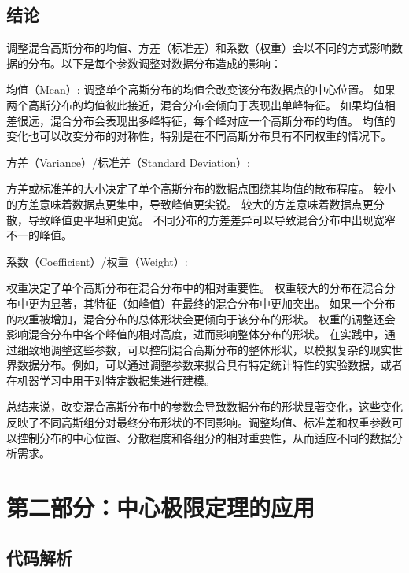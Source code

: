 \documentclass[a4paper]{article}
\begin{document}
\subsection{结论}
调整混合高斯分布的均值、方差（标准差）和系数（权重）会以不同的方式影响数据的分布。以下是每个参数调整对数据分布造成的影响：
\begin{list}
    \item 均值（Mean）:
调整单个高斯分布的均值会改变该分布数据点的中心位置。
如果两个高斯分布的均值彼此接近，混合分布会倾向于表现出单峰特征。
如果均值相差很远，混合分布会表现出多峰特征，每个峰对应一个高斯分布的均值。
均值的变化也可以改变分布的对称性，特别是在不同高斯分布具有不同权重的情况下。

    \item 方差（Variance）/标准差（Standard Deviation）:

方差或标准差的大小决定了单个高斯分布的数据点围绕其均值的散布程度。
较小的方差意味着数据点更集中，导致峰值更尖锐。
较大的方差意味着数据点更分散，导致峰值更平坦和更宽。
不同分布的方差差异可以导致混合分布中出现宽窄不一的峰值。

    \item 系数（Coefficient）/权重（Weight）:

权重决定了单个高斯分布在混合分布中的相对重要性。
权重较大的分布在混合分布中更为显著，其特征（如峰值）在最终的混合分布中更加突出。
如果一个分布的权重被增加，混合分布的总体形状会更倾向于该分布的形状。
权重的调整还会影响混合分布中各个峰值的相对高度，进而影响整体分布的形状。
在实践中，通过细致地调整这些参数，可以控制混合高斯分布的整体形状，以模拟复杂的现实世界数据分布。例如，可以通过调整参数来拟合具有特定统计特性的实验数据，或者在机器学习中用于对特定数据集进行建模。

\end{list}





总结来说，改变混合高斯分布中的参数会导致数据分布的形状显著变化，这些变化反映了不同高斯组分对最终分布形状的不同影响。调整均值、标准差和权重参数可以控制分布的中心位置、分散程度和各组分的相对重要性，从而适应不同的数据分析需求。


\section{第二部分：中心极限定理的应用}

\subsection{代码解析}
\end{document}
